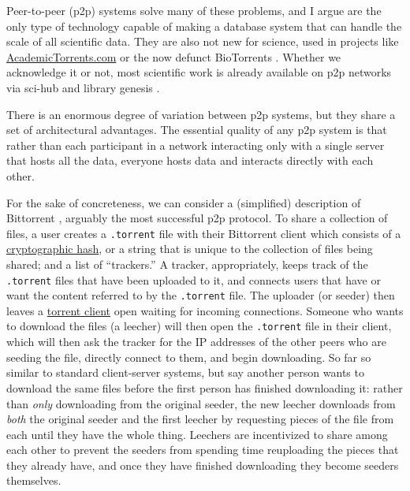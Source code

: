 Peer-to-peer (p2p) systems solve many of these problems, and I argue are
the only type of technology capable of making a database system that can
handle the scale of all scientific data. They are also not new for
science, used in projects like
\href{https://academictorrents.com/}{AcademicTorrents.com} \citep{cohenAcademicTorrentsCommunityMaintained2014, loAcademicTorrentsScalable2016}  or the now defunct BioTorrents \citep{langilleBioTorrentsFileSharing2010} . Whether we acknowledge it
or not, most scientific work is already available on p2p networks via
sci-hub and library genesis \citep{himmelsteinSciHubProvidesAccess2018, sci-hubTorrentHealthTracker2022, bookwarriorLibraryGenesisDecentralized2021} .

There is an enormous degree of variation between p2p systems, but they share a set of architectural advantages. The
essential quality of any p2p system is that rather than each participant
in a network interacting only with a single server that hosts all the
data, everyone hosts data and interacts directly with each other.

For the sake of concreteness, we can consider a (simplified) description
of Bittorrent \citep{cohenBitTorrentProtocolSpecification2017} ,
arguably the most successful p2p protocol. To share a collection of
files, a user creates a \texttt{.torrent} file with their Bittorrent
client which consists of a
\href{https://en.wikipedia.org/wiki/Cryptographic_hash_function}{cryptographic
hash}, or a string that is unique to the collection of files being
shared; and a list of ``trackers.'' A tracker, appropriately, keeps
track of the \texttt{.torrent} files that have been uploaded to it, and
connects users that have or want the content referred to by the
\texttt{.torrent} file. The uploader (or seeder) then leaves a
\href{https://en.wikipedia.org/wiki/Glossary_of_BitTorrent_terms\#Client}{torrent
client} open waiting for incoming connections. Someone who wants to
download the files (a leecher) will then open the \texttt{.torrent} file
in their client, which will then ask the tracker for the IP addresses of
the other peers who are seeding the file, directly connect to them, and
begin downloading. So far so similar to standard client-server systems,
but say another person wants to download the same files before the first
person has finished downloading it: rather than \emph{only} downloading
from the original seeder, the new leecher downloads from \emph{both} the
original seeder and the first leecher by requesting pieces of the file
from each until they have the whole thing. Leechers are incentivized to
share among each other to prevent the seeders from spending time
reuploading the pieces that they already have, and once they have
finished downloading they become seeders themselves.

